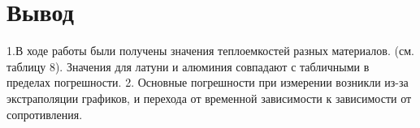 \documentclass[a4paper, 12pt]{article}%
\begin{document}
	\section{Вывод}
	1.В ходе работы были получены значения теплоемкостей разных материалов. (см. таблицу 8). Значения для латуни и алюминия совпадают с табличными в пределах погрешности. 
	2. Основные погрешности при измерении возникли из-за экстраполяции графиков, и перехода от временной зависимости к зависимости от сопротивления.
\end{document}
